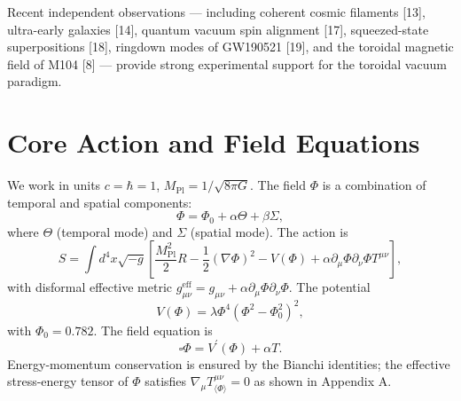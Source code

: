 \documentclass[12pt, a4paper]{article}
\begin{document}
Recent independent observations — including coherent cosmic filaments [13], ultra-early galaxies [14], quantum vacuum spin alignment [17], squeezed-state superpositions [18], ringdown modes of GW190521 [19], and the toroidal magnetic field of M104 [8] — provide strong experimental support for the toroidal vacuum paradigm.

\section{Core Action and Field Equations}
\label{sec:action}
We work in units $c = \hbar = 1$, $M_{\mathrm{Pl}} = 1 / \sqrt{8\pi G}$. The field $\Phi$ is a combination of temporal and spatial components:
\begin{equation}
\Phi = \Phi_{0} + \alpha \Theta +\beta \Sigma,
\end{equation}
where $\Theta$ (temporal mode) and $\Sigma$ (spatial mode). The action is
\begin{equation}
S = \int d^4x\sqrt{-g}\left[\frac{M_{\mathrm{Pl}}^2}{2} R - \frac{1}{2} (\nabla \Phi)^2 -V(\Phi) + \alpha \partial_{\mu}\Phi \partial_{\nu}\Phi T^{\mu \nu}\right],
\end{equation}
with disformal effective metric $g_{\mu \nu}^{\mathrm{eff}} = g_{\mu \nu} + \alpha \partial_{\mu}\Phi \partial_{\nu}\Phi$. The potential
\begin{equation}
V(\Phi) = \lambda \Phi^4 (\Phi^2 -\Phi_0^2)^2,
\end{equation}
with $\Phi_0 = 0.782$. The field equation is
\begin{equation}
\square \Phi = V^{\prime}(\Phi) + \alpha T.
\end{equation}
Energy-momentum conservation is ensured by the Bianchi identities; the effective stress-energy tensor of $\Phi$ satisfies $\nabla_{\mu}T_{\langle \Phi \rangle}^{\mu \nu} = 0$ as shown in Appendix A.

\end{document}
